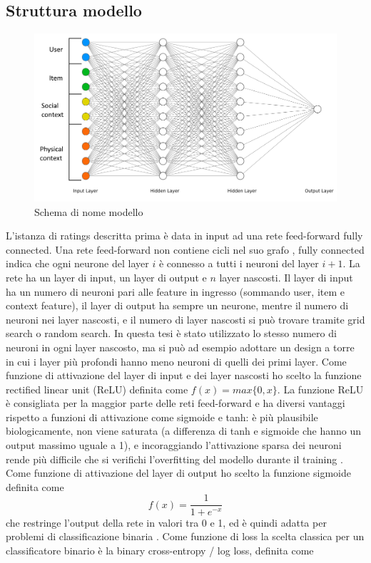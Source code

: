 \documentclass[12pt,italian]{report}
\begin{document}
\subsection{Struttura modello}

\begin{figure}
  \includegraphics[width=\linewidth]{immagini/ffnet_schema.png}
  \caption{Schema di nome modello}
  \label{fig:ffnet}
\end{figure}

L'istanza di ratings descritta prima è data in input ad una rete feed-forward fully connected. Una rete feed-forward non contiene cicli nel suo grafo \cite{Goodfellow-et-al-2016}, fully connected indica che ogni neurone del layer $i$ è connesso a tutti i neuroni del layer $i+1$. La rete ha un layer di input, un layer di output e $n$ layer nascosti. Il layer di input ha un numero di neuroni pari alle feature in ingresso (sommando user, item e context feature), il layer di output ha sempre un neurone, mentre il numero di neuroni nei layer nascosti, e il numero di layer nascosti si può trovare tramite grid search o random search. In questa tesi è stato utilizzato lo stesso numero di neuroni in ogni layer nascosto, ma si può ad esempio adottare un design a torre in cui i layer più profondi hanno meno neuroni di quelli dei primi layer. Come funzione di attivazione del layer di input e dei layer nascosti ho scelto la funzione rectified linear unit (ReLU) definita come $f(x) = max\{0, x\}$. La funzione ReLU è consigliata per la maggior parte delle reti feed-forward \cite{Goodfellow-et-al-2016} e ha diversi vantaggi rispetto a funzioni di attivazione come sigmoide e tanh: è più plausibile biologicamente, non viene saturata (a differenza di tanh e sigmoide che hanno un output massimo uguale a 1), e incoraggiando l'attivazione sparsa dei neuroni rende più difficile che si verifichi l'overfitting del modello durante il training \cite{relu}. Come funzione di attivazione del layer di output ho scelto la funzione sigmoide definita come 
$$f
(x) = \frac{1}{1+e^{-x}}
$$
che restringe l'output della rete in valori tra 0 e 1, ed è quindi adatta per problemi di classificazione binaria \cite{choose-act-func}. Come funzione di loss la scelta classica per un classificatore binario è la binary cross-entropy / log loss, definita come
\end{document}
